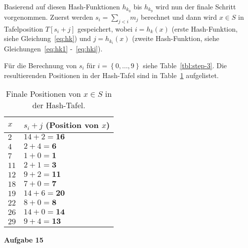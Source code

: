 \documentclass{article}
\begin{document}
Basierend auf diesen Hash-Funktionen $h_{k_0}$ bis $h_{k_9}$ wird nun der finale
Schritt vorgenommen. Zuerst werden $s_i = \sum_{j < i} m_j$ berechnet und dann
wird $x \in S$ in Tafelposition $T\left[ s_i + j \right]$ gespeichert, wobei
$i = h_k \left( x \right)$ (erste Hash-Funktion, siehe Gleichung~\ref{eq:hk}) und
$j = h_{k_i} \left( x \right)$ (zweite Hash-Funktion, siehe
Gleichungen~\ref{eq:hk1} -~\ref{eq:hki}).

F{\"u}r die Berechnung von $s_i$ f{\"u}r $i = \left\{ 0, \ldots, 9 \right\}$ siehe
Table~\ref{tbl:step-3}. Die resultierenden Positionen in der Hash-Tafel sind in
Table~\ref{tbl:final-pos} aufgelistet.

\begin{table}[H]
  \centering
  \begin{tabular}{l|l}
    $x$ & $s_i + j$ (Position von $x$)  \tabularnewline
    \hline\hline
    $2$ & $14 + 2 = \textbf{16}$        \tabularnewline
    \hline
    $4$ & $2 + 4 = \textbf{6}$          \tabularnewline
    \hline
    $7$ & $1 + 0 = \textbf{1}$          \tabularnewline
    \hline
    $11$ & $2 + 1 = \textbf{3}$         \tabularnewline
    \hline
    $12$ & $9 + 2 = \textbf{11}$         \tabularnewline
    \hline
    $18$ & $7 + 0 = \textbf{7}$         \tabularnewline
    \hline
    $19$ & $14 + 6 = \textbf{20}$       \tabularnewline
    \hline
    $22$ & $8 + 0 = \textbf{8}$         \tabularnewline
    \hline
    $26$ & $14 + 0 = \textbf{14}$       \tabularnewline
    \hline
    $29$ & $9 + 4 = \textbf{13}$        \tabularnewline
    \hline
  \end{tabular}
  \caption{Finale Positionen von $x \in S$ in der Hash-Tafel.}
  \label{tbl:final-pos}
\end{table}

\clearpage

{\bfseries Aufgabe 15}%
\end{document}
